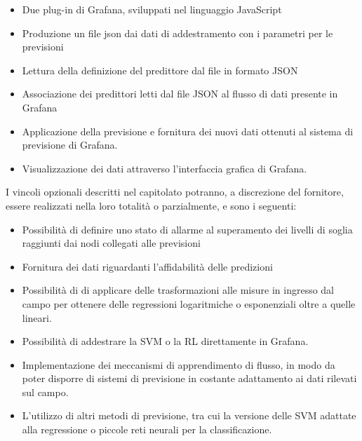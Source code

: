	 	\begin{itemize}
	 		\item Due plug-in di Grafana, sviluppati nel linguaggio JavaScript
	 		\item  Produzione un file json dai dati di addestramento con i parametri per le previsioni
			\item Lettura della definizione del predittore dal file in formato JSON
			\item Associazione dei predittori letti dal file JSON al flusso di dati presente in Grafana 
			\item Applicazione della previsione e fornitura dei nuovi dati ottenuti al sistema di previsione di Grafana.
			\item Visualizzazione dei dati attraverso l’interfaccia grafica di Grafana.
			
	 	\end{itemize}
	 	I vincoli opzionali descritti nel capitolato potranno, a discrezione del fornitore, essere realizzati nella loro totalità o parzialmente, e sono i seguenti:
		\begin{itemize}
			\item Possibilità di definire uno stato di allarme al superamento dei livelli di soglia raggiunti dai nodi collegati alle previsioni
			\item Fornitura dei dati riguardanti l’affidabilità delle predizioni
			\item Possibilità di di applicare delle trasformazioni alle misure in ingresso dal campo per ottenere delle regressioni logaritmiche o esponenziali oltre a quelle lineari.
			\item Possibilità di addestrare la SVM o la RL direttamente in Grafana.
			\item Implementazione dei meccanismi di apprendimento di flusso, in modo da poter disporre di sistemi di previsione in costante adattamento ai dati rilevati sul campo.
			\item L’utilizzo di altri metodi di previsione, tra cui la versione delle SVM adattate alla regressione o piccole reti neurali per la classificazione.

		\end{itemize}